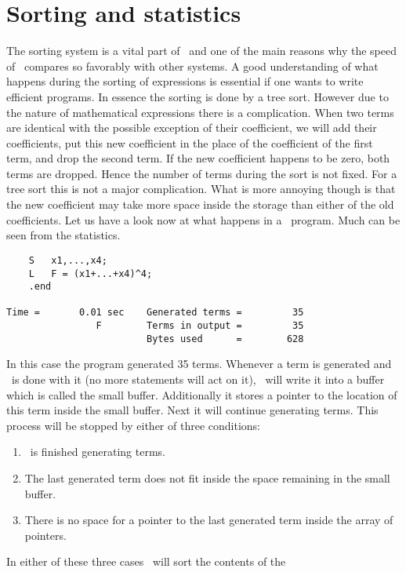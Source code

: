 
\section{Sorting and statistics}
\label{sorting}

The sorting system is a vital part of \FORM\ and one of the main reasons why 
the speed of \FORM\ compares so favorably with other systems. 
A good understanding of what happens during the sorting of 
expressions is essential if one wants to write efficient 
programs. In essence the sorting is done by a tree sort. 
However due to the nature of mathematical expressions there is a 
complication. When two terms are identical with the possible exception of 
their coefficient, we will add their coefficients, put this new coefficient 
in the place of the coefficient of the first term, and drop the second 
term. If the new coefficient happens to be zero, both terms are dropped. 
Hence the number of terms during the sort is not fixed. For a tree sort 
this is not a major complication. What is more annoying 
though is that the new coefficient may take more space inside the storage 
than either of the old coefficients. Let us have a look now at what happens 
in a \FORM\ program. Much can be seen from the statistics.
\begin{verbatim}
    S	x1,...,x4;
    L	F = (x1+...+x4)^4;
    .end

Time =       0.01 sec    Generated terms =         35
                F        Terms in output =         35
                         Bytes used      =        628
\end{verbatim}
In this case the program generated 35 terms. Whenever a term is generated 
and \FORM\ is done with it (no more statements will act on it), \FORM\ 
will write it into a buffer which is called the small buffer. Additionally 
it stores a pointer to the location of this term inside the small buffer. 
Next it will continue generating terms. This process will be stopped by 
either of three conditions:
\begin{enumerate}
\item \FORM\ is finished generating terms.
\item The last generated term does not fit inside the space remaining in 
the small buffer.
\item There is no space for a pointer to the last generated term inside the 
array of pointers.
\end{enumerate}
In either of these three cases \FORM\ will sort the contents of the 
